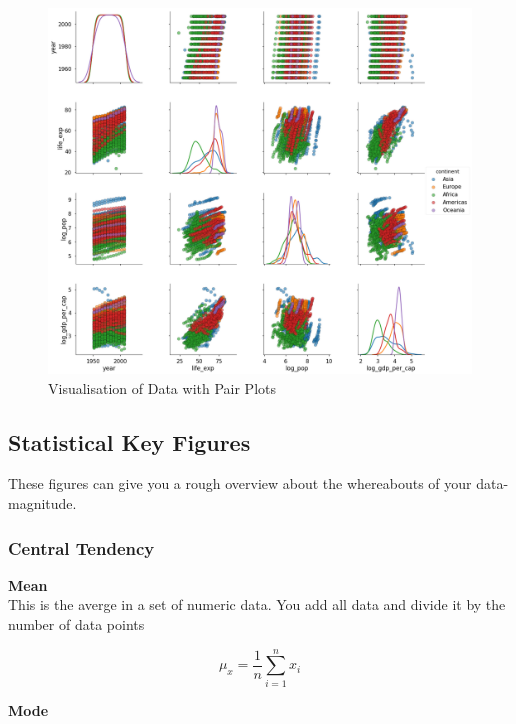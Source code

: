 \documentclass[a4paper, 11pt]{article}
\begin{document}
\begin{figure}[htb!]
    \centering
    \includegraphics[keepaspectratio=true, width=0.4\textheight]{pair_plots.png}
    \caption{Visualisation of Data with Pair Plots}
    \label{fig:pair_plots}
\end{figure}

\newpage

\subsection{Statistical Key Figures}

These figures can give you a rough overview about the whereabouts of your data-magnitude.

\subsubsection{Central Tendency}

\textbf{Mean} \\

This is the averge in a set of numeric data. You add all data and divide it by the number of data points

\begin{equation}
	\mu_{x}=\frac{1}{n} \sum^{n}_{i=1} x_{i}
\end{equation}

\vspace{10px}

\noindent \textbf{Mode} \\
\end{document}

